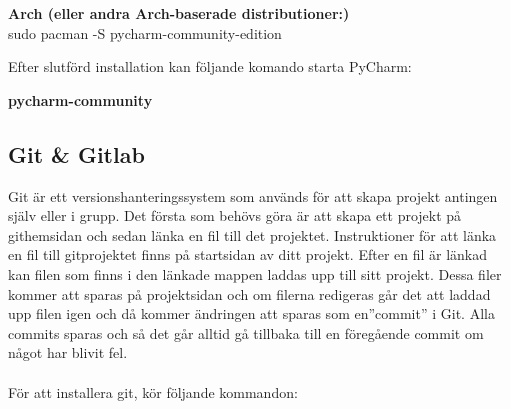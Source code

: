 \documentclass{TDP003mall}
\begin{document}
\textbf{Arch (eller andra Arch-baserade distributioner:)}\\
sudo pacman -S pycharm-community-edition

Efter slutförd installation kan följande komando starta PyCharm:

\textbf{pycharm-community}

\subsection*{Git \& Gitlab}
Git är ett versionshanteringssystem som används för att skapa projekt antingen själv eller i grupp.
Det första som behövs göra är att skapa ett projekt på githemsidan och sedan länka en fil till det projektet.
Instruktioner för att länka en fil till gitprojektet finns på startsidan av ditt projekt. Efter en fil är länkad kan
filen som finns i den länkade mappen laddas upp till sitt projekt. Dessa filer kommer att sparas på projektsidan
och om filerna redigeras går det att laddad upp filen igen och då kommer ändringen att sparas som en''commit'' i Git. Alla commits sparas och så det går alltid gå tillbaka till en föregående commit om något har blivit fel.\\\\
För att installera git, kör följande kommandon:\\
\end{document}
